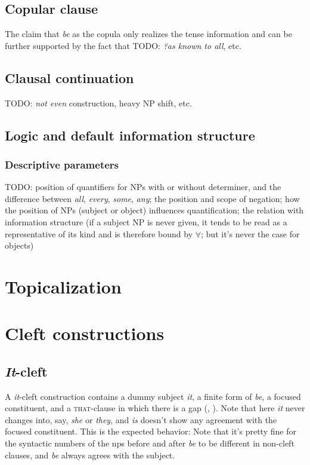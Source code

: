 \documentclass[UTF8, a4paper, oneside, scheme=plain, 12pt]{ctexbook}
\newcommand{\form}[1]{\emph{#1}}
\newcommand{\formcat}[1]{\textsc{#1}}
\begin{document}
\subsection{Copular clause}

The claim that \form{be} as the copula only realizes the tense information 
and can be further supported by the fact 
that TODO: \form{?as known to all}, etc.

\subsection{Clausal continuation}

TODO: \form{not even} construction, heavy NP shift, etc.


\subsection{Logic and default information structure}

\subsubsection{Descriptive parameters}

TODO: position of quantifiers for NPs with or without determiner,
and the difference between \form{all}, \form{every}, \form{some}, \form{any};
the position and scope of negation;
how the position of NPs (subject or object) influences quantification;
the relation with information structure
(if a subject NP is never given, 
it tends to be read as a representative of its kind and is therefore bound by $\forall$;
but it's never the case for objects)

\section{Topicalization}\label{sec:simple-clause.information.topicalization}

\section{Cleft constructions}

\subsection{\form{It}-cleft}

A \form{it}-cleft construction 
contains a dummy subject \form{it},
a finite form of \form{be}, 
a focused constituent,
and a \formcat{that}-clause in which there is a gap
(, ).
Note that here \form{it} never changes into, say, \form{she} or \form{they},
and \form{is} doesn't show any agreement with the focused constituent.
This is the expected behavior: 
Note that it's pretty fine 
for the syntactic numbers of the \acs{np}s 
before and after \form{be} to be different
in non-cleft clauses, 
and \form{be} always agrees with the subject.
\end{document}

